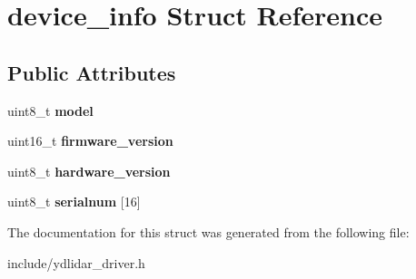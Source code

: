 \hypertarget{structdevice__info}{}\section{device\+\_\+info Struct Reference}
\label{structdevice__info}
\subsection*{Public Attributes}
\begin{DoxyCompactItemize}
\item 
uint8\+\_\+t {\bfseries model}\hypertarget{structdevice__info_a3c491b342ed11af3c70358e7e8f6c935}{}\label{structdevice__info_a3c491b342ed11af3c70358e7e8f6c935}

\item 
uint16\+\_\+t {\bfseries firmware\+\_\+version}\hypertarget{structdevice__info_af3d369a410577d85ec6b59ffeeaade48}{}\label{structdevice__info_af3d369a410577d85ec6b59ffeeaade48}

\item 
uint8\+\_\+t {\bfseries hardware\+\_\+version}\hypertarget{structdevice__info_add77e9b0edbc4a0dbd8f91b0cac9ea13}{}\label{structdevice__info_add77e9b0edbc4a0dbd8f91b0cac9ea13}

\item 
uint8\+\_\+t {\bfseries serialnum} \mbox{[}16\mbox{]}\hypertarget{structdevice__info_abf23e35480aff36d846085ca6fd0eec3}{}\label{structdevice__info_abf23e35480aff36d846085ca6fd0eec3}

\end{DoxyCompactItemize}


The documentation for this struct was generated from the following file\+:\begin{DoxyCompactItemize}
\item 
include/ydlidar\+\_\+driver.\+h\end{DoxyCompactItemize}
